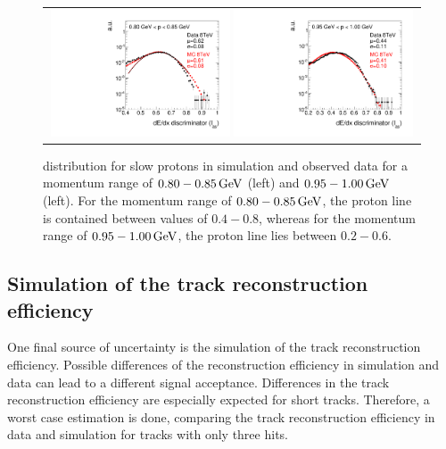 \begin{figure}[!t]
  \centering 
  \begin{tabular}{c}
    \includegraphics[width=0.49\textwidth]{figures/analysis/Interpretation/hIas_analysis_2015_11_30_ForThesis_ptmin0p80_ptmax0p85.pdf} 
    \includegraphics[width=0.49\textwidth]{figures/analysis/Interpretation/hIas_analysis_2015_11_30_ForThesis_ptmin0p95_ptmax1p0.pdf}
  \end{tabular}
  \caption{\ias distribution for slow protons in simulation and observed data for a momentum range of $0.80-0.85\,\text{Ge}\kern-0.06667em\text{V}$ (left) and $0.95-1.00\,\text{Ge}\kern-0.06667em\text{V}$ (left).
           For the momentum range of $0.80-0.85\,\text{Ge}\kern-0.06667em\text{V}$, the proton line is contained between \ias values of $0.4-0.8$, whereas for the momentum range of $0.95-1.00\,\text{Ge}\kern-0.06667em\text{V}$, the proton line \ias lies between $0.2-0.6$.  }
  \label{fig:IasSlowProtons}
\end{figure} 


\subsection*{Simulation of the track reconstruction efficiency}
One final source of uncertainty is the simulation of the track reconstruction efficiency.
Possible differences of the reconstruction efficiency in simulation and data can lead to a different signal acceptance.
Differences in the track reconstruction efficiency are especially expected for short tracks.
Therefore, a worst case estimation is done, comparing the track reconstruction efficiency in data and simulation for tracks with only three hits.

